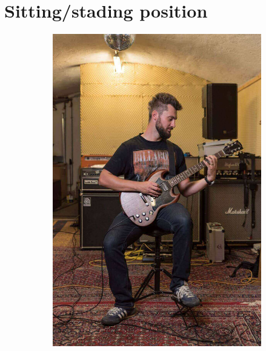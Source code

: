 \section{Sitting/stading position}

\begin{figure}[h]
  \begin{subfigure}[b]{0.45\textwidth}
    \includegraphics[width=\textwidth]{../Images/Letty_Guitar-Shooting_sitting.jpg}
    \caption{}
    \label{fig:positin_sitting}
  \end{subfigure}
  \hfill
  \begin{subfigure}[b]{0.45\textwidth}

\end{subfigure}
\end{figure}
